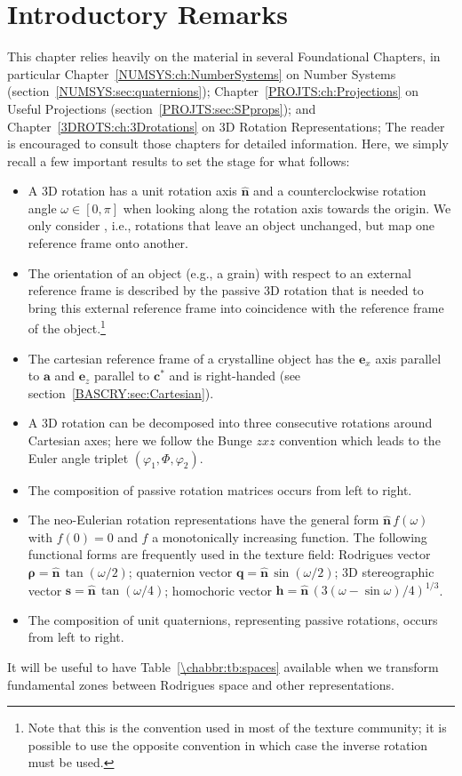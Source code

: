 \section{Introductory Remarks}\label{\chabbr:sec:intro}
This chapter relies heavily on the material in several Foundational Chapters, in particular  Chapter~\ref{NUMSYS:ch:NumberSystems} on Number Systems (section~\ref{NUMSYS:sec:quaternions});  Chapter~\ref{PROJTS:ch:Projections} on Useful Projections (section~\ref{PROJTS:sec:SPprops}); and Chapter~\ref{3DROTS:ch:3Drotations} on 3D Rotation Representations;  The reader is encouraged to consult those chapters for detailed information.  Here, we simply recall a few important results to set the stage for what follows:
\begin{itemize}
	\item A 3D rotation has a unit rotation axis $\hat{\mathbf{n}}$ and a counterclockwise rotation angle $\omega\in[0,\pi]$ when looking along the rotation axis towards the origin.  We only consider , i.e., rotations that leave an object unchanged, but map one reference frame onto another.
	\item The orientation of an object (e.g., a grain) with respect to an external reference frame is described by the passive 3D rotation that is needed to bring this external reference frame into coincidence with the reference frame of the object.\footnote{Note that this is the convention used in most of the texture community; it is possible to use the opposite convention in which case the inverse rotation must be used.}	
	\item The cartesian reference frame of a crystalline object has the $\mathbf{e}_x$ axis parallel to $\mathbf{a}$ and $\mathbf{e}_z$ parallel to $\mathbf{c}^{\ast}$ and is right-handed (see section~\ref{BASCRY:sec:Cartesian}).
	\item A 3D rotation can be decomposed into three consecutive rotations around Cartesian axes; here we follow the Bunge $zxz$ convention which leads to the Euler angle triplet $(\varphi_1,\Phi,\varphi_2)$.
	\item The composition of passive rotation matrices occurs from left to right.
	\item The neo-Eulerian rotation representations have the general form $\hat{\mathbf{n}}\,f(\omega)$ with $f(0)=0$ and $f$ a monotonically increasing function. The following functional forms are frequently used in the texture field: Rodrigues vector $\bm{\rho}=\hat{\mathbf{n}}\,\tan(\omega/2)$; quaternion vector $\mathbf{q}=\hat{\mathbf{n}}\,\sin(\omega/2)$; 3D stereographic vector $\mathbf{s}=\hat{\mathbf{n}}\,\tan(\omega/4)$; homochoric vector $\mathbf{h}=\hat{\mathbf{n}}\,(3(\omega-\sin\omega)/4)^{1/3}$.
	\item The composition of unit quaternions, representing passive rotations, occurs from left to right. 
\end{itemize}
It will be useful to have Table~\ref{\chabbr:tb:spaces} available when we transform fundamental zones between Rodrigues space and other representations.

